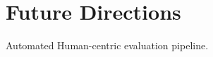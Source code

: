 \section{Future Directions}
\label{section:conc-future}

Automated Human-centric evaluation pipeline.